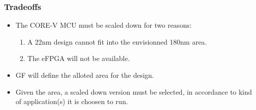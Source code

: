 \documentclass[10pt,aspectratio=169,presentation]{beamer}
\begin{document}
   \begin{frame}
     \frametitle{Tradeoffs}
     \begin{itemize}
       \setlength\itemsep{1.0\baselineskip}
       \item The CORE-V MCU must be scaled down for two reasons:
             \begin{enumerate}
               \setlength\itemsep{1.0\baselineskip}
               \item A 22nm design cannot fit into the envisionned 180nm area.
               \item The eFPGA will not be available.
             \end{enumerate}
       \item GF will define the alloted area for the design.
       \item Given the area, a scaled down version must be selected,
             in accordance to kind of application(s) it is choosen to run.
     \end{itemize}
   \end{frame}
\end{document}
